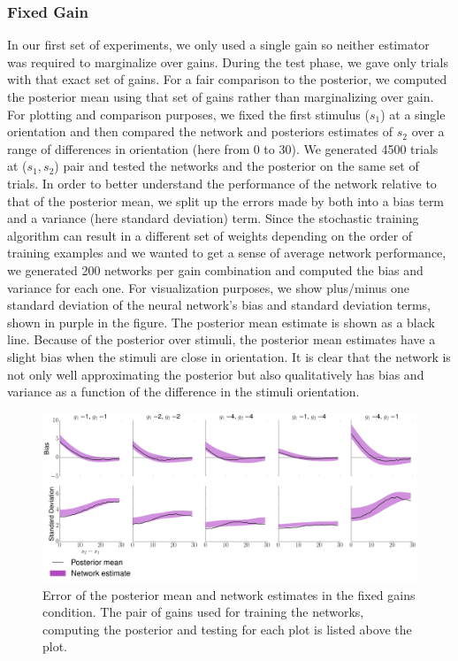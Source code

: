 \documentclass{article} %
\begin{document}
\subsubsection{Fixed Gain}
In our first set of experiments, we only used a single gain so neither estimator was required to marginalize over gains. During the test phase, we gave only trials with that exact set of gains. For a fair comparison to the posterior, we computed the posterior mean using that set of gains rather than marginalizing over gain. For plotting and comparison purposes, we fixed the first stimulus ($s_1$) at a single orientation and then compared the network and posteriors estimates of $s_2$ over a range of differences in orientation (here from 0 to 30). We generated 4500 trials at ($s_1, s_2$) pair and tested the networks and the posterior on the same set of trials. In order to better understand the performance of the network relative to that of the posterior mean, we split up the errors made by both into a bias term and a variance (here standard deviation) term. Since the stochastic training algorithm can result in a different set of weights depending on the order of training examples and we wanted to get a sense of average network performance, we generated 200 networks per gain combination and computed the bias and variance for each one. For visualization purposes, we show plus/minus one standard deviation of the neural network's bias and standard deviation terms, shown in purple in the figure. The posterior mean estimate is shown as a black line. Because of the posterior over stimuli, the posterior mean estimates have a slight bias when the stimuli are close in orientation. It is clear that the network is not only well approximating the posterior but also qualitatively has bias and variance as a function of the difference in the stimuli orientation.
\begin{figure}[h]
\centering
\includegraphics[width = \textwidth]{Fixed_Gains.png}
\caption{Error of the posterior mean and network estimates in the fixed gains condition. The pair of gains used for training the networks, computing the posterior and testing for each plot is listed above the plot.}
\end{figure}
\\
\\
\end{document}
